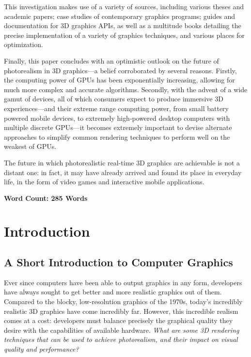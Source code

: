 \documentclass[11pt, oneside]{report}
\begin{document}
This investigation makes use of a variety of sources, including various theses and academic papers; case studies of contemporary graphics programs; guides and documentation for 3D graphics \glspl{API}, as well as a multitude books detailing the precise implementation of a variety of graphics techniques, and various places for optimization.

Finally, this paper concludes with an optimistic outlook on the future of photorealism in 3D graphics—a belief corroborated by several reasons. Firstly, the computing power of \glspl{GPU} has been exponentially increasing, allowing for much more complex and accurate algorithms. Secondly, with the advent of a wide gamut of devices, all of which consumers expect to produce immersive 3D experiences---and their extreme range computing power, from small battery powered mobile devices, to extremely high-powered desktop computers with multiple discrete \glspl{GPU}---it becomes extremely important to devise alternate approaches to simplify common rendering techniques to perform well on the weakest of \glspl{GPU}.

The future in which photorealistic real-time 3D graphics are achievable is not a distant one: in fact, it may have already arrived and found its place in everyday life, in the form of video games and interactive mobile applications.

\textbf{Word Count: 285 Words}

\tableofcontents

\chapter{Introduction}
\section{A Short Introduction to Computer Graphics}
Ever since computers have been able to output graphics in any form, developers have always sought to get better and more realistic graphics out of them. Compared to the blocky, low-resolution graphics of the 1970s, today’s incredibly realistic 3D graphics have come incredibly far. However, this incredible realism comes at a cost: developers must balance precisely the graphical quality they desire with the capabilities of available hardware. \textit{What are some 3D rendering techniques that can be used to achieve photorealism, and their impact on visual quality and performance?}
\end{document}
